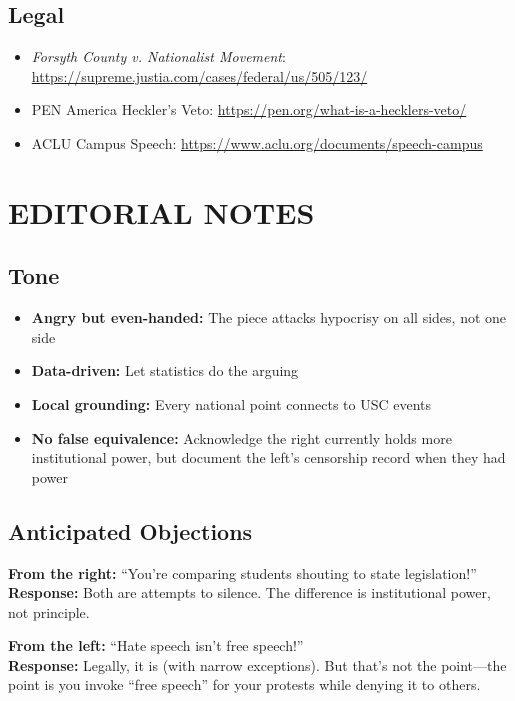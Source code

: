 \documentclass[11pt,letterpaper]{article}
\begin{document}
\subsection{Legal}
\begin{itemize}[noitemsep]
    \item \textit{Forsyth County v. Nationalist Movement}: \url{https://supreme.justia.com/cases/federal/us/505/123/}
    \item PEN America Heckler's Veto: \url{https://pen.org/what-is-a-hecklers-veto/}
    \item ACLU Campus Speech: \url{https://www.aclu.org/documents/speech-campus}
\end{itemize}

\section{EDITORIAL NOTES}

\subsection{Tone}
\begin{itemize}[noitemsep]
    \item \textbf{Angry but even-handed:} The piece attacks hypocrisy on all sides, not one side
    \item \textbf{Data-driven:} Let statistics do the arguing
    \item \textbf{Local grounding:} Every national point connects to USC events
    \item \textbf{No false equivalence:} Acknowledge the right currently holds more institutional power, but document the left's censorship record when they had power
\end{itemize}

\subsection{Anticipated Objections}

\textbf{From the right:} ``You're comparing students shouting to state legislation!''\\
\textbf{Response:} Both are attempts to silence. The difference is institutional power, not principle.

\textbf{From the left:} ``Hate speech isn't free speech!''\\
\textbf{Response:} Legally, it is (with narrow exceptions). But that's not the point---the point is you invoke ``free speech'' for your protests while denying it to others.
\end{document}
